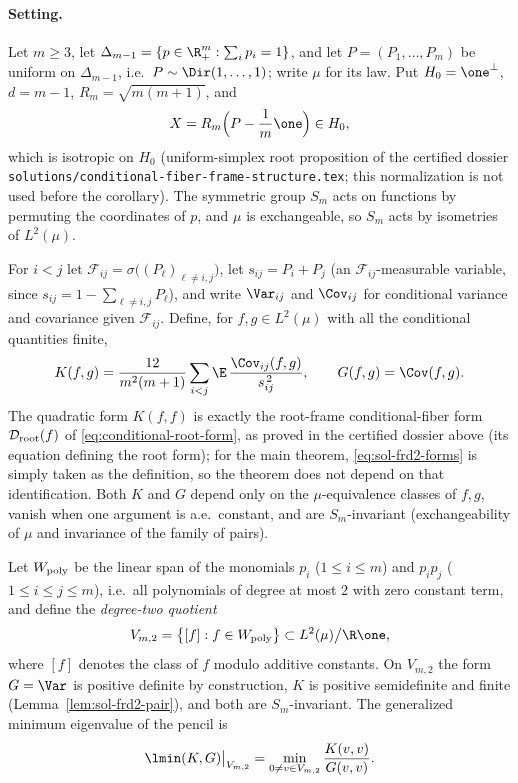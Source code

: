 \documentclass[../main.tex]{subfiles}
\begin{document}
\paragraph{Setting.}
Let $m\ge3$, let $\Delta_{m-1}=\{p\in\R_+^m:\sum_ip_i=1\}$, and let
$P=(P_1,\dots,P_m)$ be uniform on $\Delta_{m-1}$, i.e.\ $P\sim\Dir(1,\dots,1)$; write
$\mu$ for its law.  Put $H_0=\one^\perp$, $d=m-1$, $R_m=\sqrt{m(m+1)}$, and
\begin{equation}
  X=R_m\Bigl(P-\frac1m\one\Bigr)\in H_0,
  \label{eq:sol-frd2-isotropic}
\end{equation}
which is isotropic on $H_0$ (uniform-simplex root proposition of the certified dossier
\texttt{solutions/conditional-fiber-frame-structure.tex}; this normalization is not
used before the corollary).  The symmetric group $S_m$ acts on functions by permuting
the coordinates of $p$, and $\mu$ is exchangeable, so $S_m$ acts by isometries of
$L^2(\mu)$.

For $i<j$ let $\mathcal F_{ij}=\sigma\bigl((P_\ell)_{\ell\ne i,j}\bigr)$, let
$s_{ij}=P_i+P_j$ (an $\mathcal F_{ij}$-measurable variable, since
$s_{ij}=1-\sum_{\ell\ne i,j}P_\ell$), and write $\Var_{ij}$ and $\Cov_{ij}$ for
conditional variance and covariance given $\mathcal F_{ij}$.  Define, for
$f,g\in L^2(\mu)$ with all the conditional quantities finite,
\begin{equation}
  K(f,g)
  =\frac{12}{m^2(m+1)}\sum_{i<j}
    \E\,\frac{\Cov_{ij}(f,g)}{s_{ij}^{\,2}},
  \qquad
  G(f,g)=\Cov(f,g).
  \label{eq:sol-frd2-forms}
\end{equation}
The quadratic form $K(f,f)$ is exactly the root-frame conditional-fiber form
$\mathcal D_{\rm root}(f)$ of \eqref{eq:conditional-root-form}, as proved in the
certified dossier above (its equation defining the root form); for the main theorem,
\eqref{eq:sol-frd2-forms} is simply taken as the definition, so the theorem does not
depend on that identification.  Both $K$ and $G$ depend only on the $\mu$-equivalence
classes of $f,g$, vanish when one argument is a.e.\ constant, and are $S_m$-invariant
(exchangeability of $\mu$ and invariance of the family of pairs).

Let $W_{\rm poly}$ be the linear span of the monomials
$p_i$ ($1\le i\le m$) and $p_ip_j$ ($1\le i\le j\le m$), i.e.\ all polynomials of degree
at most $2$ with zero constant term, and define the \emph{degree-two quotient}
\begin{equation}
  V_{m,2}
  =\bigl\{[f]:f\in W_{\rm poly}\bigr\}
  \subset L^2(\mu)\big/\R\one,
  \label{eq:sol-frd2-V}
\end{equation}
where $[f]$ denotes the class of $f$ modulo additive constants.  On $V_{m,2}$ the form
$G=\Var$ is positive definite by construction, $K$ is positive semidefinite and finite
(Lemma~\ref{lem:sol-frd2-pair}), and both are $S_m$-invariant.  The generalized
minimum eigenvalue of the pencil is
\begin{equation}
  \lmin(K,G)\big|_{V_{m,2}}
  =\min_{0\ne v\in V_{m,2}}\frac{K(v,v)}{G(v,v)}.
  \label{eq:sol-frd2-lmin}
\end{equation}
\end{document}
